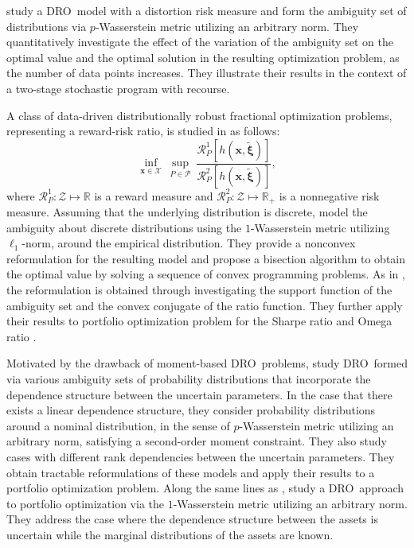 \documentclass[final,onefignum,onetabnum]{class}
\newcommand{\bs}[1]{\boldsymbol{#1}} %
\newcommand{\Bs}[1]{\mathbb{#1}} %
\newcommand{\Cs}[1]{\mathcal{#1}} %
\newcommand{\txi}{\tilde{\bs{\xi}}}
\newcommand{\dro}{DRO}
\begin{document}
\citet{pichler2017} study a \dro\ model with a distortion risk measure and form the ambiguity set of distributions via $p$-Wasserstein metric utilizing an arbitrary norm. They quantitatively investigate the effect of  the variation of the ambiguity set on  the optimal value and the optimal solution in the resulting optimization problem, as the number of data points increases. %
They illustrate their results in the context of a two-stage stochastic program with recourse. %


A class of data-driven distributionally robust fractional optimization problems, representing a reward-risk ratio, is studied in \citet{ji2017} as follows:
\begin{equation}
\inf_{\bs{x} \in \Cs{X} } \ \sup_{P \in \Cs{P}} \ 	\frac{\Cs{R}^{1}_{P}\left[h(\bs{x},\txi)\right]}{\Cs{R}^{2}_{P}\left[h(\bs{x},\txi)\right]},
\end{equation}
where $\Cs{R}^{1}_{P}: \Cs{Z} \mapsto \Bs{R}$ is a reward measure and $\Cs{R}^{2}_{P}: \Cs{Z} \mapsto \Bs{R}_{+}$ is a  nonnegative risk measure. 
Assuming that the underlying distribution is discrete, \citet{ji2017} model the  ambiguity about  discrete distributions using the  $1$-Wasserstein metric utilizing $\ell_1$-norm, around the empirical distribution. %
They  provide  a nonconvex reformulation for the resulting model and propose a bisection algorithm to obtain the  optimal value by solving a sequence of convex programming problems. As in \citet{postek2016}, the reformulation is obtained through investigating the support function of the ambiguity set and the convex conjugate of the ratio function. They further apply their results to portfolio optimization problem for the Sharpe ratio \cite{sharpe1966} and Omega ratio \cite{keating2002}.  





Motivated by the drawback of moment-based \dro\ problems,  \citet{gao2017dep} study \dro\ formed via various ambiguity sets of probability distributions that incorporate the dependence structure between the uncertain parameters.
In the case that there exists a linear dependence structure, they consider probability distributions around a nominal distribution, in the sense of  $p$-Wasserstein metric utilizing an arbitrary norm, satisfying a second-order moment constraint. They also study cases with different rank dependencies between the uncertain parameters. They obtain tractable reformulations of these models  and apply their results to a portfolio optimization problem. 
Along the same lines as \citet{gao2017dep},  \citet{pflug2017review} study a \dro\ approach to portfolio optimization via  the $1$-Wasserstein metric utilizing an arbitrary norm. They address the case where the dependence structure between the assets is uncertain while the marginal distributions of the assets are known.  %
\end{document}
